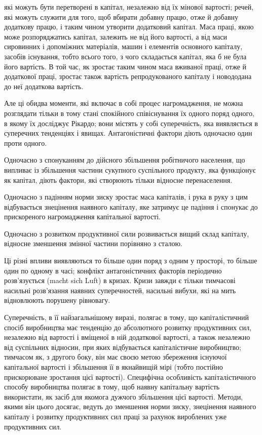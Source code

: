 які можуть бути перетворені в капітал, незалежно від їх мінової
вартості; речей, які можуть служити для того, щоб вбирати добавну
працю, отже й добавну додаткову працю, і таким чином
утворити додатковий капітал. Маса праці, якою може розпоряджатись
капітал, залежить не від його вартості, а від маси
сировинних і допоміжних матеріалів, машин і елементів основного
капіталу, засобів існування, тобто всього того, з чого складається
капітал, яка б не була його вартість. В той час, як зростає
таким чином маса вживаної праці, отже й додаткової праці, зростає
також вартість репродукованого капіталу і новододана до
неї додаткова вартість.

Але ці обидва моменти, які включає в собі процес нагромадження,
не можна розглядати тільки в тому стані спокійного співіснування
їх одного поряд одного, в якому їх досліджує Рікардо;
вони містять у собі суперечність, яка виявляється в суперечних
тенденціях і явищах. Антагоністичні фактори діють одночасно
один проти одного.

Одночасно з спонуканням до дійсного збільшення робітничого
населення, що випливає із збільшення частини сукупного
суспільного продукту, яка функціонує як капітал, діють фактори,
які створюють тільки відносне перенаселення.

Одночасно з падінням норми зиску зростає маса капіталів,
і рука в руку з цим відбувається знецінення наявного капіталу,
яке затримує це падіння і спонукає до прискореного нагромадження
капітальної вартості.

Одночасно з розвитком продуктивної сили розвивається
вищий склад капіталу, відносне зменшення змінної частини порівняно
з сталою.

Ці різні впливи виявляються то більше один поряд з одним
у просторі, то більше один по одному в часі; конфлікт антагоністичних
факторів періодично розв’язується (macht sich Luft)
в кризах. Кризи завжди є тільки тимчасові насильні розв’язання
наявних суперечностей, насильні вибухи, які на мить відновлюють
порушену рівновагу.

Суперечність, в її найзагальнішому виразі, полягає в тому,
що капіталістичний спосіб виробництва має тенденцію до абсолютного
розвитку продуктивних сил, незалежно від вартості і
вміщеної в ній додаткової вартості, а також незалежно від
суспільних відносин, при яких відбувається капіталістичне виробництво;
тимчасом як, з другого боку, він має своєю метою
збереження існуючої капітальної вартості і збільшення її в якнайвищій
мірі (тобто постійно прискорюване зростання цієї вартості).
Специфічна особливість капіталістичного способу виробництва
полягає в тому, щоб наявну капітальну вартість використати,
як засіб для якомога дужчого збільшення цієї вартості. Методи,
якими він цього досягає, ведуть до зменшення норми зиску,
знецінення наявного капіталу і розвитку продуктивних сил праці
за рахунок вироблених уже продуктивних сил.
